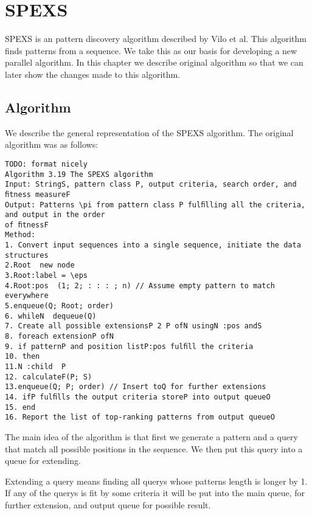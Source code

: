 \chapter{SPEXS}

SPEXS is an pattern discovery algorithm described by Vilo et al.
This algorithm finds patterns from a sequence.
We take this as our basis for developing a new parallel algorithm.
In this chapter we describe original algorithm so that we can
later show the changes made to this algorithm.

\section{Algorithm}

We describe the general representation of the SPEXS algorithm. 
The original algorithm was as follows:

\begin{verbatim}
TODO: format nicely
Algorithm 3.19 The SPEXS algorithm
Input: StringS, pattern class P, output criteria, search order, and ﬁtness measureF
Output: Patterns \pi from pattern class P fulﬁlling all the criteria, and output in the order
of ﬁtnessF
Method:
1. Convert input sequences into a single sequence, initiate the data structures
2.Root  new node
3.Root:label = \eps
4.Root:pos  (1; 2; : : : ; n) // Assume empty pattern to match everywhere
5.enqueue(Q; Root; order)
6. whileN  dequeue(Q)
7. Create all possible extensionsP 2 P ofN usingN :pos andS
8. foreach extensionP ofN
9. if patternP and position listP:pos fulﬁll the criteria
10. then
11.N :child  P
12. calculateF(P; S)
13.enqueue(Q; P; order) // Insert toQ for further extensions
14. ifP fulﬁlls the output criteria storeP into output queueO
15. end
16. Report the list of top-ranking patterns from output queueO
\end{verbatim}

The main idea of the algorithm is that first we generate a 
pattern and a query that match all possible positions in 
the sequence. We then put this query into a queue for extending.

Extending a query means finding all querys whose patterns length
is longer by 1. If any of the querys is fit by some criteria
it will be put into the main queue, for further extension, 
and output queue for possible result.